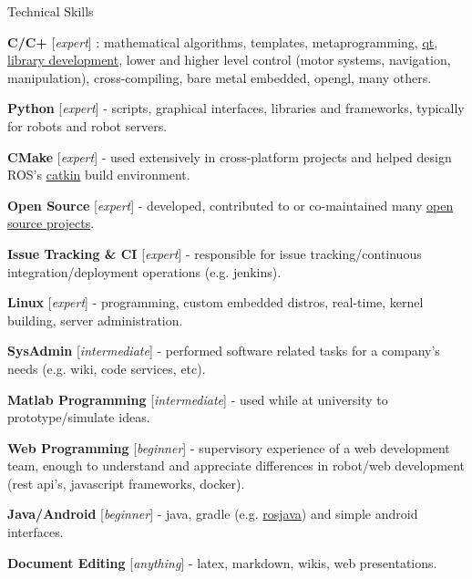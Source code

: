 \documentclass[a4paper,10pt]{article}
\begin{document}
\begin{cvsection}{Technical Skills}
 \raggedright
  \begin{djs_itemize}
    \item \textbf{C/C+} [\textit{expert}] : mathematical algorithms, templates, metaprogramming, \href{https://github.com/Itseez/opencv/pull/3194}{qt}, \href{https://github.com/stonier/ecl_core}{library development}, lower and higher level control (motor systems, navigation, manipulation), cross-compiling, bare metal embedded, opengl, many others.
    \item \textbf{Python} [\textit{expert}] - scripts, graphical interfaces, libraries and frameworks, typically for robots and robot servers.
    \item \textbf{CMake} [\textit{expert}] - used extensively in cross-platform projects and helped design ROS's \href{https://github.com/ros/catkin}{catkin} build environment.
    \item \textbf{Open Source} [\textit{expert}] - developed, contributed to or co-maintained many \href{https://github.com/stonier}{open source projects}.
    \item \textbf{Issue Tracking \& CI} [\textit{expert}] - responsible for issue tracking/continuous integration/deployment operations (e.g. jenkins).
    \item \textbf{Linux} [\textit{expert}] - programming, custom embedded distros, real-time, kernel building, server administration.
    \item \textbf{SysAdmin} [\textit{intermediate}] - performed software related tasks for a company's needs (e.g. wiki, code services, etc).
    \item \textbf{Matlab Programming} [\textit{intermediate}] - used while at university to prototype/simulate ideas.
    \item \textbf{Web Programming} [\textit{beginner}] - supervisory experience of a web development team, enough to understand and appreciate differences in robot/web development (rest api's, javascript frameworks, docker).
    \item \textbf{Java/Android} [\textit{beginner}] - java, gradle (e.g. \href{https://github.com/rosjava}{rosjava}) and simple android interfaces.
    \item \textbf{Document Editing} [\textit{anything}] - latex, markdown, wikis, web presentations.
  \end{djs_itemize}
\end{cvsection}
\end{document}
